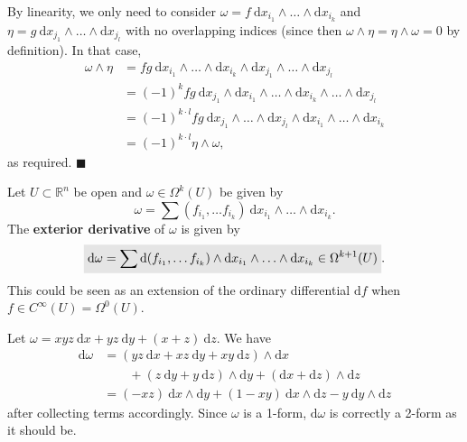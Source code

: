 \documentclass[letter-paper]{tufte-book}
\newenvironment{proof}[1][Proof]{\begin{trivlist}
\item[\hskip \labelsep {\bfseries #1}]}{\end{trivlist}}
\newenvironment{example}[1][Example]{\begin{trivlist}
\item[\hskip \labelsep {\bfseries #1}]}{\end{trivlist}}
\newcommand{\qed}{\hfill$\blacksquare$}
\newcommand{\highlight}[1]{\mathchoice%
  {\colorbox{black!10}{$\displaystyle#1$}}%
  {\colorbox{black!10}{$\textstyle#1$}}%
  {\colorbox{black!10}{$\scriptstyle#1$}}%
  {\colorbox{black!10}{$\scriptscriptstyle#1$}}}%
\begin{document}
\begin{proof}
  By linearity, we only need to consider $\omega = f\ \mathrm{d}x_{i_1} \wedge \ldots \wedge \mathrm{d}x_{i_k}$ and $\eta = g\ \mathrm{d}x_{j_1} \wedge \ldots \wedge \mathrm{d}x_{j_l}$ with no overlapping indices (since then $\omega \wedge \eta = \eta \wedge \omega = 0$ by definition). In that case,
  \begin{align*}
    \omega \wedge \eta
      &= fg\ \mathrm{d}x_{i_1} \wedge \ldots \wedge \mathrm{d}x_{i_k} \wedge \mathrm{d}x_{j_1} \wedge \ldots \wedge \mathrm{d}x_{j_l} \\
      &= (-1)^k fg\ \mathrm{d}x_{j_1} \wedge \mathrm{d}x_{i_1} \wedge \ldots \wedge \mathrm{d}x_{i_k} \wedge \ldots \wedge \mathrm{d}x_{j_l} \\
      &= (-1)^{k\cdot l} fg\ \mathrm{d}x_{j_1} \wedge \ldots \wedge \mathrm{d}x_{j_l} \wedge \mathrm{d}x_{i_1} \wedge \ldots \wedge \mathrm{d}x_{i_k}\\
      &= (-1)^{k\cdot l} \eta \wedge \omega,
  \end{align*}
  as required. \qed
\end{proof}

Let $U \subset \mathbb{R}^n$ be open and $\omega \in \Omega^k(U)$ be given by
\begin{equation*}
  \omega = \sum (f_{i_1}, \ldots f_{i_k})\ \mathrm{d}x_{i_1} \wedge \ldots \wedge \mathrm{d}x_{i_k}.
\end{equation*}
The \textbf{exterior derivative} of $\omega$ is given by
\begin{equation}
  \highlight{\mathrm{d}\omega = \sum \mathrm{d}(f_{i_1}, \ldots f_{i_k}) \wedge \mathrm{d}x_{i_1} \wedge \ldots \wedge \mathrm{d}x_{i_k} \in \Omega^{k+1}(U)}.
\end{equation}
This could be seen as an extension of the ordinary differential $\mathrm{d}f$ when $f \in C^\infty (U) = \Omega^0(U)$.

\begin{example}
  Let $\omega = xyz\ \mathrm{d}x + yz\ \mathrm{d}y + (x+z)\ \mathrm{d}z$. We have
  \begin{align*}
    \mathrm{d}\omega 
      &= (yz\ \mathrm{d}x + xz\ \mathrm{d}y + xy\ \mathrm{d}z) \wedge \mathrm{d}x \\
      & \qquad + (z\ \mathrm{d}y + y\ \mathrm{d}z)\wedge \mathrm{d}y + (\mathrm{d}x + \mathrm{d}z)\wedge \mathrm{d}z\\
      &= (-xz)\ \mathrm{d}x \wedge \mathrm{d}y + (1-xy)\ \mathrm{d}x \wedge \mathrm{d}z - y\ \mathrm{d}y \wedge \mathrm{d}z
  \end{align*}
  after collecting terms accordingly. Since $\omega$ is a 1-form, $\mathrm{d}\omega$ is correctly a 2-form as it should be.
\end{example}
\end{document}
